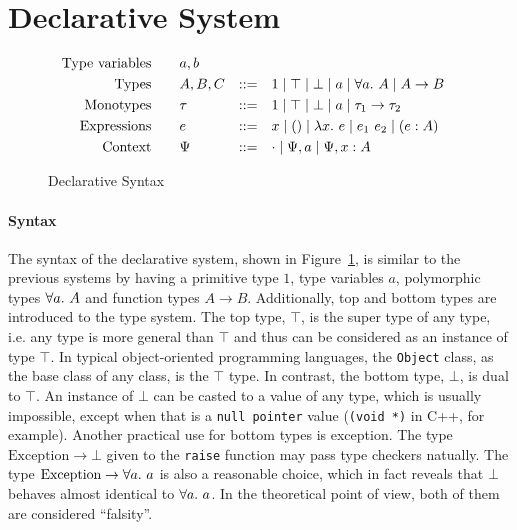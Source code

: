 
\section{Declarative System}

\begin{figure}[t]
    \begin{gather*}
    \begin{aligned}
        \text{Type variables}\qquad&a, b\\
        \text{Types}\qquad&A, B, C &::=&\quad 1 \mid \top \mid \bot \mid a \mid \all A \mid A\to B\\
        \text{Monotypes}\qquad&\tau &::=&\quad 1 \mid \top \mid \bot \mid a \mid \tau_1\to \tau_2\\
        \text{Expressions}\qquad&e &::=&\quad x \mid () \mid \lam e \mid e_1~e_2 \mid (e:A)\\
        \text{Context}\qquad&\Psi &::=&\quad \cdot \mid \Psi, a \mid \Psi, x:A
    \end{aligned}
    \end{gather*}
\caption{Declarative Syntax}\label{fig:top_decl_syntax}
\end{figure}

\paragraph{Syntax}
The syntax of the declarative system, shown in Figure~\ref{fig:top_decl_syntax},
is similar to the previous systems by having
a primitive type $1$, type variables $a$,
polymorphic types $\all A$ and function types $A \to B$.
Additionally, top and bottom types are introduced to the type system.
The top type, $\top$, is the super type of any type,
i.e. any type is more general than $\top$
and thus can be considered as an instance of type $\top$.
In typical object-oriented programming languages, the \texttt{Object} class,
as the base class of any class, is the $\top$ type.
In contrast, the bottom type, $\bot$, is dual to $\top$.
An instance of $\bot$ can be casted to a value of any type, which is usually impossible,
except when that is a \texttt{null pointer} value (\texttt{(void *)} in C++, for example).
Another practical use for bottom types is exception.
The type $\text{Exception} \to \bot$ given to the \texttt{raise}
function may pass type checkers natually.
The type $\text{Exception} \to \all a$ is also a reasonable choice,
which in fact reveals that $\bot$ behaves almost identical to $\all a$.
In the theoretical point of view, both of them are considered ``falsity''.

